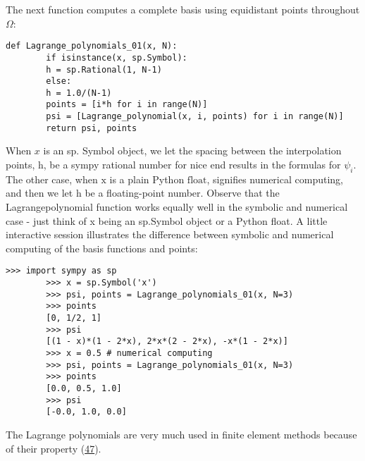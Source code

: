 \documentclass[../main.tex]{subfiles}
\begin{document}
	The next function computes a complete basis using equidistant points throughout
	$\Omega$:
	\begin{lstlisting}[numbers=none]
		def Lagrange_polynomials_01(x, N):
		if isinstance(x, sp.Symbol):
		h = sp.Rational(1, N-1)
		else:
		h = 1.0/(N-1)
		points = [i*h for i in range(N)]
		psi = [Lagrange_polynomial(x, i, points) for i in range(N)]
		return psi, points	
	\end{lstlisting}
	When $x$ is an sp. Symbol object, we let the spacing between the interpolation points, $\mathrm{h}$, be a sympy rational number for nice end results in the formulas for $\psi_{i}$. The other case, when $\mathrm{x}$ is a plain Python $\mathrm{float}$, signifies numerical computing, and then we let $\mathrm{h}$ be a floating-point number. Observe that the Lagrange\textunderscore polynomial function works equally well in the symbolic and numerical case - just think of x being an sp.Symbol object or a Python float. A little
	interactive session illustrates the difference between symbolic and numerical
	computing of the basis functions and points:
	\begin{lstlisting}[numbers=none]
		>>> import sympy as sp
		>>> x = sp.Symbol('x')
		>>> psi, points = Lagrange_polynomials_01(x, N=3)
		>>> points
		[0, 1/2, 1]
		>>> psi
		[(1 - x)*(1 - 2*x), 2*x*(2 - 2*x), -x*(1 - 2*x)]
		>>> x = 0.5 # numerical computing
		>>> psi, points = Lagrange_polynomials_01(x, N=3)
		>>> points
		[0.0, 0.5, 1.0]
		>>> psi
		[-0.0, 1.0, 0.0]	
	\end{lstlisting}
	The Lagrange polynomials are very much used in finite element methods because
	of their property (\hyperref[eqa47]{47}).
	
\end{document}
